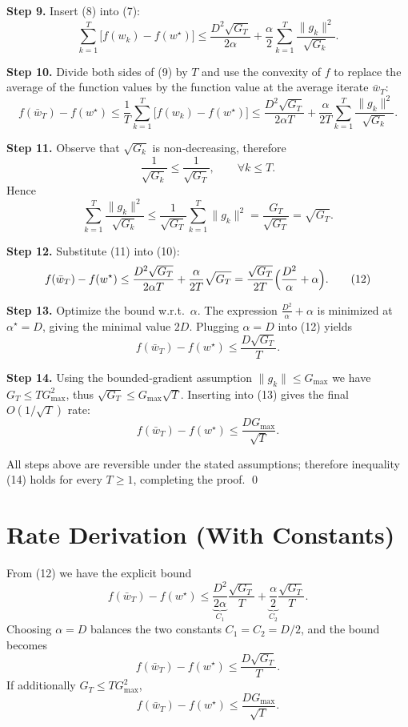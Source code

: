 \documentclass{article}
\begin{document}
\noindent\textbf{Step 9.} Insert (8) into (7):
\[
\sum_{k=1}^{T}\bigl[f(w_{k})-f(w^{\star})\bigr]
 \le
 \frac{D^{2}\sqrt{G_{T}}}{2\alpha}
 +\frac{\alpha}{2}\sum_{k=1}^{T}\frac{\|g_{k}\|^{2}}{\sqrt{G_{k}}}.
\tag{9}
\]

\noindent\textbf{Step 10.} Divide both sides of (9) by $T$ and use the convexity of $f$ to replace the average of the function values by the function value at the average iterate $\bar w_{T}$:
\[
f(\bar w_{T})-f(w^{\star})
 \le
 \frac{1}{T}\sum_{k=1}^{T}\bigl[f(w_{k})-f(w^{\star})\bigr]
 \le
 \frac{D^{2}\sqrt{G_{T}}}{2\alpha T}
 +\frac{\alpha}{2T}\sum_{k=1}^{T}\frac{\|g_{k}\|^{2}}{\sqrt{G_{k}}}.
\tag{10}
\]

\noindent\textbf{Step 11.} Observe that $\sqrt{G_{k}}$ is non‑decreasing, therefore
\[
\frac{1}{\sqrt{G_{k}}}\le\frac{1}{\sqrt{G_{T}}},\qquad
\forall k\le T.
\]
Hence
\[
\sum_{k=1}^{T}\frac{\|g_{k}\|^{2}}{\sqrt{G_{k}}}
 \le
 \frac{1}{\sqrt{G_{T}}}\sum_{k=1}^{T}\|g_{k}\|^{2}
 =\frac{G_{T}}{\sqrt{G_{T}}}= \sqrt{G_{T}}.
\tag{11}
\]

\noindent\textbf{Step 12.} Substitute (11) into (10):
\[
f(\bar w_{T})-f(w^{\star})
 \le
 \frac{D^{2}\sqrt{G_{T}}}{2\alpha T}
 +\frac{\alpha}{2T}\sqrt{G_{T}}
 =\frac{\sqrt{G_{T}}}{2T}\Bigl(\frac{D^{2}}{\alpha}+\alpha\Bigr).
\tag{12}
\]

\noindent\textbf{Step 13.} Optimize the bound w.r.t.\ $\alpha$. The expression $\frac{D^{2}}{\alpha}+\alpha$ is minimized at $\alpha^{\star}=D$, giving the minimal value $2D$. Plugging $\alpha=D$ into (12) yields
\[
f(\bar w_{T})-f(w^{\star})
 \le
 \frac{D\sqrt{G_{T}}}{T}.
\tag{13}
\]

\noindent\textbf{Step 14.} Using the bounded‑gradient assumption $\|g_{k}\|\le G_{\max}$ we have $G_{T}\le T G_{\max}^{2}$, thus $\sqrt{G_{T}}\le G_{\max}\sqrt{T}$. Inserting into (13) gives the final $O(1/\sqrt{T})$ rate:
\[
f(\bar w_{T})-f(w^{\star})
 \le
 \frac{DG_{\max}}{\sqrt{T}}.
\tag{14}
\]

All steps above are reversible under the stated assumptions; therefore inequality (14) holds for every $T\ge1$, completing the proof. \qed

\section*{Rate Derivation (With Constants)}
From (12) we have the explicit bound
\[
f(\bar w_{T})-f(w^{\star})
 \le
 \underbrace{\frac{D^{2}}{2\alpha}}_{C_{1}}
 \frac{\sqrt{G_{T}}}{T}
 +\underbrace{\frac{\alpha}{2}}_{C_{2}}
 \frac{\sqrt{G_{T}}}{T}.
\]
Choosing $\alpha=D$ balances the two constants $C_{1}=C_{2}=D/2$, and the bound becomes
\[
f(\bar w_{T})-f(w^{\star})\le\frac{D\sqrt{G_{T}}}{T}.
\]
If additionally $G_{T}\le T G_{\max}^{2}$,
\[
f(\bar w_{T})-f(w^{\star})\le\frac{DG_{\max}}{\sqrt{T}}.
\]
\end{document}

